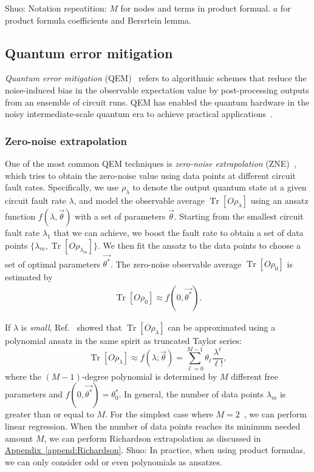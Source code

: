 \documentclass[aps,pra,reprint,groupedaddress,floatfix]{revtex4-2}
\newcommand{\append}[1]{\hyperref[append:#1]{Appendix~\ref*{append:#1}}}
\newcommand{\sz}[1]{{\color{blue} Shuo: #1}}
\begin{document}
\sz{Notation repeatition: $M$ for nodes and terms in product formual. $a$ for product formula coefficients and Bersrtein lemma.}

\subsection{Quantum error mitigation}
\textit{Quantum error mitigation} (QEM)~\cite{cai2023quantum} refers to algorithmic schemes that reduce the noise-induced bias in the observable expectation value by post-processing outputs from an ensemble of circuit runs. QEM has enabled the quantum hardware in the noisy intermediate-scale quantum era to achieve practical applications~\cite{preskill2018quantum}.

\subsubsection{Zero-noise extrapolation}
One of the most common QEM techniques is \textit{zero-noise extrapolation} (ZNE)~\cite{li2017efficient, PhysRevLett.119.180509}, which tries to obtain the zero-noise value using data points at different circuit fault rates. Specifically, we use $\rho_\lambda$ to denote the output quantum state at a given circuit fault rate $\lambda$, and model the observable average $\operatorname{Tr}[O\rho_\lambda]$ using an ansatz function $f(\lambda,\vec{\theta})$ with a set of parameters $\vec{\theta}$. Starting from the smallest circuit fault rate $\lambda_1$ that we can achieve, we boost the fault rate to obtain a set of data points $\{\lambda_m,\operatorname{Tr}[O\rho_{\lambda_m}]\}$. We then fit the ansatz to the data points to choose a set of optimal parameters $\vec{\theta^*}$. The zero-noise observable average $\operatorname{Tr}[O\rho_0]$ is estimated by
\begin{align*}
    \operatorname{Tr}[O\rho_0]\approx f(0,\vec{\theta^*}).
\end{align*}

If $\lambda$ is \textit{small}, Ref.~\cite{PhysRevLett.119.180509} showed that $\operatorname{Tr}[O\rho_\lambda]$ can be approximated using a polynomial ansatz in the same spirit as truncated Taylor series:
\begin{equation*}
\operatorname{Tr}\left[O \rho_\lambda\right] \approx f(\lambda ; \vec{\theta})=\sum_{\ell=0}^{M-1} \theta_{\ell} \frac{\lambda^{\ell}}{\ell!},
\end{equation*}
where the $(M-1)$-degree polynomial is determined by $M$ different free parameters and $f(0,\vec{\theta^*})={\theta_0^*}$. In general, the number of data points $\lambda_m$ is greater than or equal to $M$. For the simplest case where $M=2$~\cite{li2017efficient}, we can perform linear regression. When the number of data points reaches its minimum needed amount $M$, we can perform Richardson extrapolation as discussed in \append{Richardson}. \sz{In practice, when using product formulas, we can only consider odd or even polynomials as ansatzes.}
\end{document}
